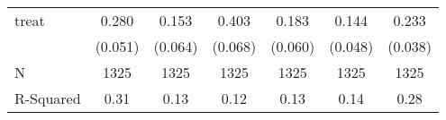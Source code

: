 {\begin{tabular}{l*{6}{c}}
treat               &       0.280\sym{***}&       0.153\sym{*}  &       0.403\sym{***}&       0.183\sym{**} &       0.144\sym{**} &       0.233\sym{***}\\
&     (0.051)         &     (0.064)         &     (0.068)         &     (0.060)         &     (0.048)         &     (0.038)         \\
\hline
N                   &        1325         &        1325         &        1325         &        1325         &        1325         &        1325         \\
R-Squared           &        0.31         &        0.13         &        0.12         &        0.13         &        0.14         &        0.28         \\
\hline\hline
\end{tabular}
}

